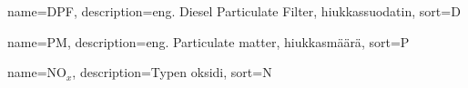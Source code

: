 
{
name={DPF},
description={eng. Diesel Particulate Filter, hiukkassuodatin},
sort={D}
}

{
name={PM},
description={eng. Particulate matter, hiukkasmäärä},
sort={P}
}

{
name={NO\(_x\)},
description={Typen oksidi},
sort={N}
}